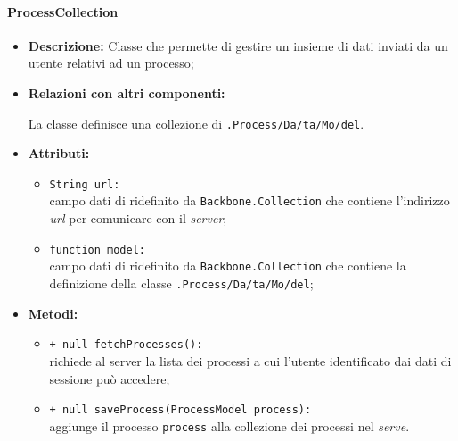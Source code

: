 \paragraph{ProcessCollection}
\label{processCollection}
\begin{flushleft}
\begin{itemize}
\item \textbf{Descrizione:} Classe che permette di gestire un insieme di dati inviati da un utente relativi ad un processo;
\item \textbf{Relazioni con altri componenti:}
\begin{sloppypar}
La classe definisce una collezione di \texttt{\model{}.Process\fshyp{}Da\fshyp{}ta\fshyp{}Mo\fshyp{}del}.
\end{sloppypar}
\item \textbf{Attributi:}
\begin{sloppypar}
\begin{itemize}
\item \texttt{String url:}\\ campo dati di ridefinito da \texttt{Backbone.Collection} che contiene l'indirizzo \textit{url} per comunicare con il \textit{server};
\item \texttt{function model:}\\ campo dati di ridefinito da \texttt{Backbone.Collection} che contiene la definizione della classe \texttt{\model{}.Process\fshyp{}Da\fshyp{}ta\fshyp{}Mo\fshyp{}del};
\end{itemize}
\end{sloppypar}
\item \textbf{Metodi:}
\begin{sloppypar}
\begin{itemize}
\item \texttt{+ null fetchProcesses():}\\ richiede al server la lista dei processi a cui l'utente identificato dai dati di sessione può accedere;
\item \texttt{+ null saveProcess(ProcessModel process):}\\ aggiunge il processo \texttt{process} alla collezione dei processi nel \textit{serve}.
\end{itemize}
\end{sloppypar}
\end{itemize}
\end{flushleft}

